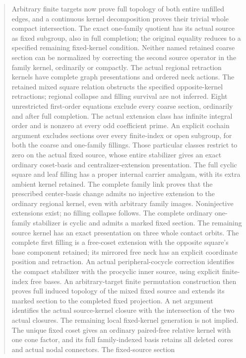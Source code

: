 \documentclass[11pt,a4paper]{article}
\begin{document}
\begin{abstract}
Arbitrary finite targets now prove full topology of both entire
unfilled edges, and a continuous kernel decomposition proves their
trivial whole compact intersection. The exact one-family quotient has
its actual source as fixed subgroup, also in full completion; the
original equality reduces to a specified remaining fixed-kernel
condition. Neither named retained coarse section can be normalized by
correcting the second source operator in the family kernel, ordinarily
or compactly. The actual regional retraction kernels have complete
graph presentations and ordered neck actions. The retained mixed square
relation obstructs the specified opposite-kernel retractions; regional
collapse and filling survival are not inferred. Eight unrestricted first-order
equations exclude every coarse section, ordinarily and after full
completion. The actual extension class has infinite integral order and
is nonzero at every odd coefficient prime. An explicit cochain argument
excludes sections over every finite-index or open subgroup, for both
the coarse and one-family fillings. Those particular classes restrict
to zero on the actual fixed source, whose entire stabilizer gives an
exact ordinary coset-basis and centralizer-extension presentation.
The full cyclic square and leaf filling has a proper internal carrier
amalgam, with its extra ambient kernel retained. The complete family
link proves that the prescribed center-basis change admits no injective
extension to the ordinary regional kernel, even with arbitrary family
images. Noninjective extensions exist; no filling collapse follows. The complete ordinary
one-family stabilizer is cyclic and admits a marked fixed section.
The remaining source kernel has an exact presentation on three whole
contact orbits. The complete first filling is a free-coset extension
with the opposite square's base component retained; its mirrored free
neck has an explicit coordinate position and retraction. An actual
peripheral-cocycle correction identifies the compact stabilizer with
the procyclic inner source, using explicit finite-index free bases.
An arbitrary-target finite permutation construction then proves full
induced topology of the mixed fixed source and extends its marked
section to the completed fixed projection. A net argument identifies
the actual source-kernel closure with the intersection of the two
actual closures. The remaining local fixed-kernel generation is not
implied.
The unique fixed coset gives an ordinary paired-free relative kernel
with one cone factor, and its full family-indexed basis retains all
deleted cores and actual nodal connectors. The fixed-source section

\end{abstract}
\end{document}
